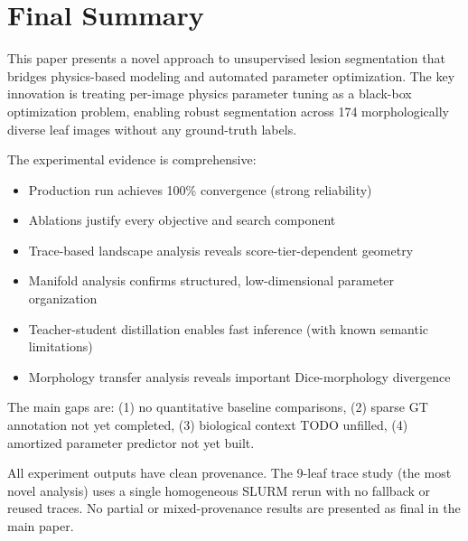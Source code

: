 \documentclass[11pt,a4paper]{article}
\begin{document}
\section{Final Summary}

This paper presents a novel approach to unsupervised lesion segmentation that bridges physics-based modeling and automated parameter optimization.  The key innovation is treating per-image physics parameter tuning as a black-box optimization problem, enabling robust segmentation across 174 morphologically diverse leaf images without any ground-truth labels.

The experimental evidence is comprehensive:
\begin{itemize}[nosep]
  \item Production run achieves 100\% convergence (strong reliability)
  \item Ablations justify every objective and search component
  \item Trace-based landscape analysis reveals score-tier-dependent geometry
  \item Manifold analysis confirms structured, low-dimensional parameter organization
  \item Teacher-student distillation enables fast inference (with known semantic limitations)
  \item Morphology transfer analysis reveals important Dice-morphology divergence
\end{itemize}

The main gaps are: (1) no quantitative baseline comparisons, (2) sparse GT annotation not yet completed, (3) biological context TODO unfilled, (4) amortized parameter predictor not yet built.

All experiment outputs have clean provenance.  The 9-leaf trace study (the most novel analysis) uses a single homogeneous SLURM rerun with no fallback or reused traces.  No partial or mixed-provenance results are presented as final in the main paper.
\end{document}
